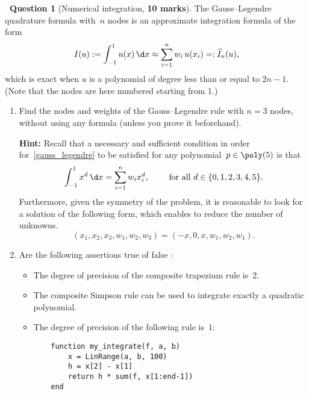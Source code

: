 \documentclass[10pt]{article}
\theoremstyle{definition}
\newtheorem{question}{{\normalfont \faGears}~Question}
\theoremstyle{remark}
\begin{document}
\newpage
\begin{question}
    [Numerical integration, \textbf{10 marks}]
    The Gauss--Legendre quadrature formula with~$n$ nodes is an approximate integration formula of the form
    \begin{equation}
        \label{gauss_legendre}
        I(u) := \int_{-1}^{1} u(x) \, \d x \approx \sum_{i=1}^{n} w_i \, u(x_i) =: \widehat I_n(u),
    \end{equation}
    which is exact when $u$ is a polynomial of degree less than or equal to $2n-1$.
    (Note that the nodes are here numbered starting from 1.)

    \begin{enumerate}
        \item
            Find the nodes and weights of the Gauss--Legendre rule with $n=3$ nodes,
            without using any formula (unless you prove it beforehand).

            \textbf{Hint:}
            Recall that a necessary and sufficient condition in order for~\eqref{gauss_legendre} to be satisfied for any polynomial~$p \in \poly(5)$ is that
            \[
                \int_{-1}^{1} x^d \, \d x= \sum_{i=1}^{n} w_i x_i^d,
                \qquad \text{ for all $d \in \{0, 1, 2, 3, 4, 5\}$}.
            \]
            Furthermore, given the symmetry of the problem,
            it is reasonable to look for a solution of the following form,
            which enables to reduce the number of unknowns.
            \[
                (x_1, x_2, x_3, w_1, w_2, w_3)
                = (-x, 0, x, w_1, w_2, w_1).
            \]

        \item {} Are the following assertions true of false :
            \begin{itemize}
                \item
                    The degree of precision of the composite trapezium rule is~$2$.

                \item
                    The composite Simpson rule can be used to integrate exactly a quadratic polynomial.

                \item
                    The degree of precision of the following rule is~$1$:
            \begin{verbatim}
    function my_integrate(f, a, b)
        x = LinRange(a, b, 100)
        h = x[2] - x[1]
        return h * sum(f, x[1:end-1])
    end
            \end{verbatim}


\end{itemize}
\end{enumerate}
\end{question}
\end{document}
